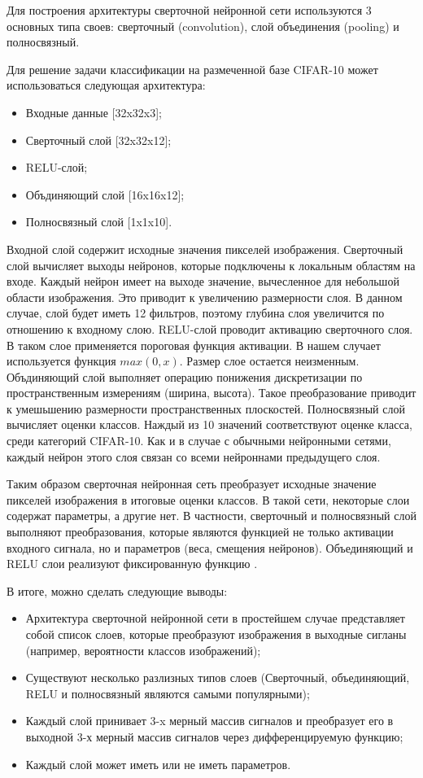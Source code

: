 \documentclass[a4paper,english,russian]{G2-105}
\begin{document}
\par Для построения архитектуры сверточной нейронной сети используются 3 основных типа своев: сверточный (convolution), слой объединения (pooling) и полносвязный. 
\par Для решение задачи классификации на размеченной базе CIFAR-10 может использоваться следующая архитектура:
\begin{itemize}
\item Входные данные [32x32x3]; 
\item Сверточный слой [32x32x12]; 
\item RELU-слой;
\item Объдиняющий слой [16x16x12];
\item Полносвязный слой [1x1x10].
\end{itemize}
\par Входной слой содержит исходные значения пикселей изображения. Сверточный слой вычисляет выходы нейронов, которые подключены к локальным областям на входе. Каждый нейрон имеет на выходе значение, вычесленное для небольшой области изображения. Это приводит к увеличению размерности слоя. В данном случае, слой будет иметь 12 фильтров, поэтому глубина слоя увеличится по отношению к входному слою. RELU-слой проводит активацию сверточного слоя. В таком слое применяется пороговая функция активации. В нашем случает используется функция $max(0, x)$. Размер слое остается неизменным. Объдиняющий слой выполняет операцию понижения дискретизации по пространственным измерениям (ширина, высота). Такое преобразование приводит к умешьшению размерности пространственных плоскостей. Полносвязный слой вычисляет оценки классов. Наждый из 10 значений соответствуют оценке класса, среди категорий CIFAR-10. Как и в случае с обычными нейронными сетями, каждый нейрон этого слоя связан со всеми нейроннами предыдущего слоя.
\par Таким образом сверточная нейронная сеть преобразует исходные значение пикселей изображения в итоговые оценки классов. В такой сети, некоторые слои содержат параметры, а другие нет. В частности, сверточный и полносвязный слой выполняют преобразования, которые являются функцией не только активации входного сигнала, но и параметров (веса, смещения нейронов). Объединяющий и RELU слои реализуют фиксированную функцию \cite{10}. 
\par В итоге, можно сделать следующие выводы:
\begin{itemize}
\item Архитектура сверточной нейронной сети в простейшем случае представляет собой список слоев, которые преобразуют изображения в выходные сигланы (например, вероятности классов изображений);
\item Существуют несколько разлизных типов слоев (Сверточный, объединяющий, RELU и полносвязный являются самыми популярными);
\item Каждый слой принивает 3-x мерный массив сигналов и преобразует его в выходной 3-х мерный массив сигналов через дифференцируемую функцию;
\item Каждый слой может иметь или не иметь параметров.
\end{itemize}
\end{document}
